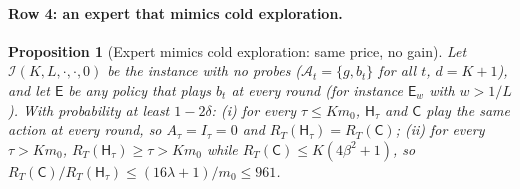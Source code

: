 \documentclass{article}
\newtheorem{proposition}{Proposition}
\theoremstyle{definition}
\theoremstyle{remark}
\theoremstyle{remark}
\newcommand{\Cold}{\mathsf{C}}
\newcommand{\Exp}{\mathsf{E}}
\newcommand{\Hyb}{\mathsf{H}}
\begin{document}
\paragraph{Row 4: an expert that mimics cold exploration.}
\begin{proposition}[Expert mimics cold exploration: same price, no gain]
\label{prop:cat-mimic}
Let $\mathcal I(K,L,\cdot,\cdot,0)$ be the instance with no probes
($\mathcal A_t=\{g,b_t\}$ for all $t$, $d=K+1$), and let $\Exp$ be any policy
that plays $b_t$ at every round (for instance $\Exp_w$ with $w>1/L$). With
probability at least $1-2\delta$: (i) for every $\tau\le Km_0$,
$\Hyb_\tau$ and $\Cold$ play the same action at every round, so
$A_\tau=I_\tau=0$ and $R_T(\Hyb_\tau)=R_T(\Cold)$; (ii) for every
$\tau>Km_0$, $R_T(\Hyb_\tau)\ge\tau>Km_0$ while $R_T(\Cold)\le K(4\beta^2+1)$,
so $R_T(\Cold)/R_T(\Hyb_\tau)\le(16\lambda+1)/m_0\le961$.
\end{proposition}
\end{document}

